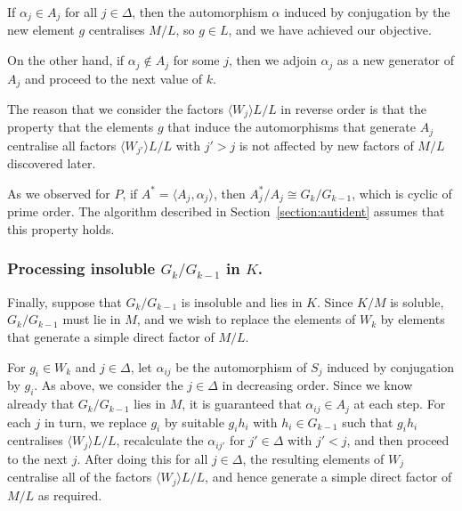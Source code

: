 \documentclass[12pt,twoside,reqno,psamsfonts]{amsproc}
\numberwithin{equation}{section}
\numberwithin{figure}{section}
\newcounter{algorithm}
\theoremstyle{plain}
\theoremstyle{definition}
\theoremstyle{remark}
\begin{document}
If $\alpha_j \in A_j$ for all
$j \in \Delta$, then the automorphism $\alpha$ induced by conjugation by the new
element $g$ centralises $M/L$, so $g \in L$, and we have achieved our objective.

On the other hand, if $\alpha_j \not\in A_j$ for some $j$, 
then we adjoin $\alpha_j$
as a new generator of $A_j$ and proceed to the next value of $k$.

The reason that we consider the factors $\langle W_j \rangle L/L$ in reverse
order is that the property that the elements $g$ that induce the automorphisms
that generate $A_j$ centralise all factors $\langle W_{j'} \rangle L/L$ 
with $j'>j$ is not affected by new factors of $M/L$ discovered later.

As we observed for $P$, if $A^* = \langle A_j, \alpha_j\rangle$,
then $A_j^*/A_j \cong G_k/G_{k-1}$, which is cyclic of prime order.
The algorithm described in Section~\ref{section:autident} assumes 
that this property holds.


\subsubsection{Processing insoluble $G_k/G_{k-1}$ in $K$.}\label{subsection:test3}
Finally, suppose that $G_k/G_{k-1}$ is insoluble and lies in $K$.
Since $K/M$ is soluble, $G_k/G_{k-1}$ must lie in $M$, and we wish to replace
the elements of $W_k$ by elements that generate a simple direct factor of $M/L$.

For $g_i \in W_k$ and $j \in \Delta$, let $\alpha_{ij}$ be the automorphism of
$S_j$ induced by conjugation by $g_i$.
As above, we consider the $j \in \Delta$ in decreasing order.
Since we know already that $G_k/G_{k-1}$ lies in $M$,
it is guaranteed that $\alpha_{ij} \in A_j$ at each step.
For each $j$ in turn, we replace $g_i$ by suitable $g_ih_i$ with
$h_i \in G_{k-1}$ such that $g_ih_i$ centralises $\langle W_j \rangle L/L$,
recalculate the $\alpha_{ij'}$ for $j' \in \Delta$ with $j'<j$, and
then proceed to the next $j$. 
After doing this for all $j \in \Delta$, the resulting elements of $W_j$
centralise all of the factors $\langle W_j \rangle L/L$, and hence
generate a simple direct factor of $M/L$ as required.
\end{document}
